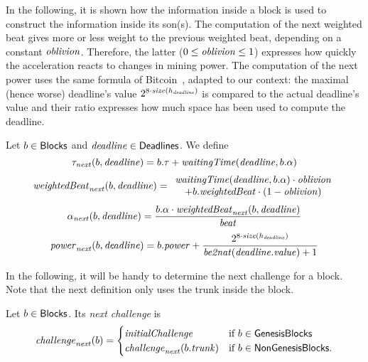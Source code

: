 In the following, it is shown how the information inside a block is used to construct
the information inside its son(s). The computation of the next weighted beat
gives more or less weight to the previous weighted beat, depending on a constant ${\mathit{oblivion}}$.
Therefore, the latter ($0\le{\mathit{oblivion}}\le 1$) expresses how quickly the acceleration reacts to changes
in mining power. The computation of the next power uses the same formula of Bitcoin~\cite{WalkerG24},
adapted to our context: the maximal (hence worse) deadline's value $2^{8\cdot{\mathit{size}}(h_{\mathit{deadline}})}$ is compared
to the actual deadline's value and their ratio expresses how much space has been used to compute the deadline.
%
\begin{definition}\label{def:next}
  Let $b\in{\mathsf{Blocks}}$ and ${\mathit{deadline}}\in{\mathsf{Deadlines}}$. We define
  \[
  \tau_{\mathit{next}}(b,{\mathit{deadline}})=b.\tau+{\mathit{waitingTime}}({\mathit{deadline}},b.\alpha)
  \]
  \[
  \mathit{weightedBeat}_{\mathit{next}}(b,{\mathit{deadline}})=\begin{array}{c}
  {\mathit{waitingTime}}({\mathit{deadline}},b.\alpha)\cdot{\mathit{oblivion}}\\
  +b.\mathit{weightedBeat}\cdot(1-{\mathit{oblivion}})
  \end{array}
  \]
  \[
  \alpha_{\mathit{next}}(b,{\mathit{deadline}})=\frac{b.\alpha\cdot\mathit{weightedBeat}_{\mathit{next}}(b,{\mathit{deadline}})}{{\mathit{beat}}}
  \]
  \[
  {\mathit{power}}_{\mathit{next}}(b,{\mathit{deadline}})=b.{\mathit{power}}+\frac{2^{8\cdot{\mathit{size}}(h_{\mathit{deadline}})}}{{\mathit{be2nat}}({\mathit{deadline}}.\mathit{value})+1}
  \]
\end{definition}

In the following, it will be handy to determine the next challenge for a block. Note that
the next definition only uses the trunk inside the block.
%
\begin{definition}\label{def:next_challenge_from_block}
  Let $b\in{\mathsf{Blocks}}$. Its \emph{next challenge} is
  \[
  {\mathit{challenge}}_{\mathit{next}}(b)=\begin{cases}
  {\mathit{initialChallenge}} & \text{if $b\in{\mathsf{GenesisBlocks}}$}\\
  {\mathit{challenge}}_{\mathit{next}}(b.{\mathit{trunk}}) & \text{if $b\in{\mathsf{NonGenesisBlocks}}$.}
  \end{cases}
  \]
\end{definition}
